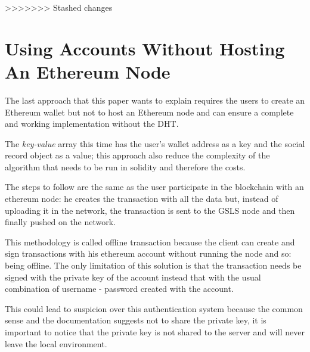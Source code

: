 %
%
%
%
>>>>>>> Stashed changes

\section{Using Accounts Without Hosting An Ethereum Node}

The last approach that this paper wants to explain requires the users to create an Ethereum wallet but not to host an Ethereum node and can ensure a complete and working implementation without the DHT.

The \textit{key-value} array this time has the user's wallet address as a key and the social record object as a value; this approach also reduce the complexity of the algorithm that needs to be run in solidity and therefore the costs.

The steps to follow are the same as the user participate in the blockchain with an ethereum node: he creates the transaction with all the data but, instead of uploading it in the network, the transaction is sent to the GSLS node and then finally pushed on the network.

This methodology is called offline transaction because the client can create and sign transactions with his ethereum account without running the node and so: being offline. The only limitation of this solution is that the transaction needs be signed with the private key of the account instead that with the usual combination of username - password created with the account.

This could lead to suspicion over this authentication system because the common sense and the documentation suggests not to share the private key, it is important to notice that the private key is not shared to the server and will never leave the local environment.


